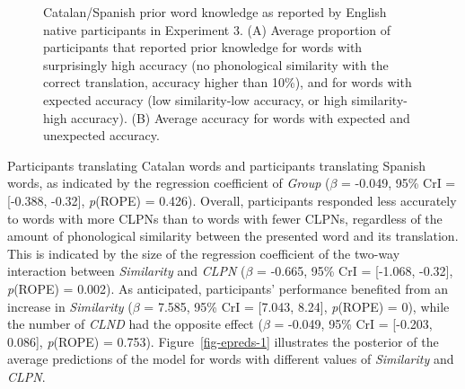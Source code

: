 \documentclass[
]{article}
\begin{document}
\begin{figure}


\caption{\label{fig-knowledge}Catalan/Spanish prior word knowledge as
reported by English native participants in Experiment 3. (A) Average
proportion of participants that reported prior knowledge for words with
surprisingly high accuracy (no phonological similarity with the correct
translation, accuracy higher than 10\%), and for words with expected
accuracy (low similarity-low accuracy, or high similarity-high
accuracy). (B) Average accuracy for words with expected and unexpected
accuracy.}

\end{figure}%

Participants translating Catalan words and participants translating
Spanish words, as indicated by the regression coefficient of
\emph{Group} (\(\beta\) = -0.049, 95\% CrI = {[}-0.388, -0.32{]},
\emph{p}(ROPE) = 0.426). Overall, participants responded less accurately
to words with more CLPNs than to words with fewer CLPNs, regardless of
the amount of phonological similarity between the presented word and its
translation. This is indicated by the size of the regression coefficient
of the two-way interaction between \emph{Similarity} and \emph{CLPN}
(\(\beta\) = -0.665, 95\% CrI = {[}-1.068, -0.32{]}, \emph{p}(ROPE) =
0.002). As anticipated, participants' performance benefited from an
increase in \emph{Similarity} (\(\beta\) = 7.585, 95\% CrI = {[}7.043,
8.24{]}, \emph{p}(ROPE) = 0), while the number of \emph{CLND} had the
opposite effect (\(\beta\) = -0.049, 95\% CrI = {[}-0.203, 0.086{]},
\emph{p}(ROPE) = 0.753). Figure~\ref{fig-epreds-1} illustrates the
posterior of the average predictions of the model for words with
different values of \emph{Similarity} and \emph{CLPN}.
\end{document}
